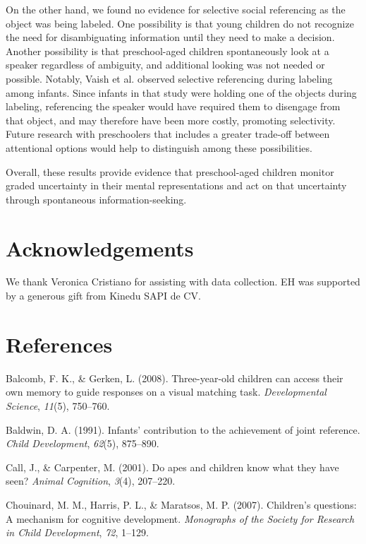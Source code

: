 \documentclass[a4paper,man,apacite,floatsintext]{apa6}
\begin{document}
On the other hand, we found no evidence for selective social referencing
as the object was being labeled. One possibility is that young children
do not recognize the need for disambiguating information until they need
to make a decision. Another possibility is that preschool-aged children
spontaneously look at a speaker regardless of ambiguity, and additional
looking was not needed or possible. Notably, Vaish et al. observed
selective referencing during labeling among infants. Since infants in
that study were holding one of the objects during labeling, referencing
the speaker would have required them to disengage from that object, and
may therefore have been more costly, promoting selectivity. Future
research with preschoolers that includes a greater trade-off between
attentional options would help to distinguish among these possibilities.

Overall, these results provide evidence that preschool-aged children
monitor graded uncertainty in their mental representations and act on
that uncertainty through spontaneous information-seeking.

\section{Acknowledgements}\label{acknowledgements}

We thank Veronica Cristiano for assisting with data collection. EH was
supported by a generous gift from Kinedu SAPI de CV.

\section{References}\label{references}

\setlength{\parindent}{-0.1in} \setlength{\leftskip}{0.125in} \noindent

\hypertarget{refs}{}
\hypertarget{ref-Balcomb2008}{}
Balcomb, F. K., \& Gerken, L. (2008). Three-year-old children can access
their own memory to guide responses on a visual matching task.
\emph{Developmental Science}, \emph{11}(5), 750--760.

\hypertarget{ref-Baldwin1991}{}
Baldwin, D. A. (1991). Infants' contribution to the achievement of joint
reference. \emph{Child Development}, \emph{62}(5), 875--890.

\hypertarget{ref-Call2001}{}
Call, J., \& Carpenter, M. (2001). Do apes and children know what they
have seen? \emph{Animal Cognition}, \emph{3}(4), 207--220.

\hypertarget{ref-Chouinard2007}{}
Chouinard, M. M., Harris, P. L., \& Maratsos, M. P. (2007). Children's
questions: A mechanism for cognitive development. \emph{Monographs of
the Society for Research in Child Development}, \emph{72}, 1--129.
\end{document}
